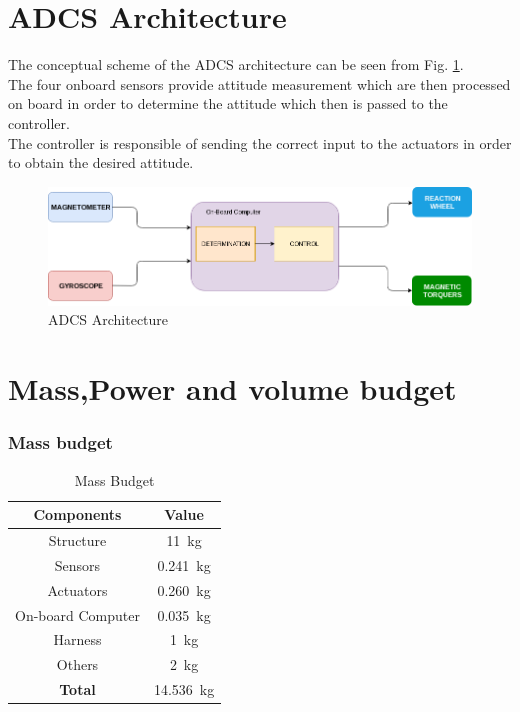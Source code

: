 \documentclass[11pt,a4paper]{report}
\begin{document}
\section{ADCS Architecture}
The conceptual scheme of the ADCS architecture can be seen from Fig. \ref{fig:architecture}.\\
The four onboard sensors provide attitude measurement which are then processed on board in order to determine the attitude which then is passed to the controller.\\
The controller is responsible of sending the correct input to the actuators in order to obtain the desired attitude.

\begin{figure}[H]
 	\centering
 	\includegraphics[scale=0.5]{gfx/adcs.png}
    \caption{ADCS Architecture}
    \label{fig:architecture}
\end{figure}

\section{Mass,Power and volume budget}

\subsubsection{Mass budget}

\begin{table}[H]
	\centering
	\begin{tabular}{|c|c|}
		\hline
		Components & Value \\
		\hline
		Structure & \SI{11}{\kilo\gram} \\
		\hline
	  	Sensors & \SI{0.241}{\kilo\gram}\\
		\hline
		Actuators & \SI{0.260}{\kilo\gram}\\
		\hline
		On-board Computer & \SI{0.035}{\kilo\gram}\\
		\hline
		Harness &  \SI{1}{\kilo\gram}\\
		\hline
        Others &  \SI{2}{\kilo\gram}\\
		\hline
		\textbf{Total} & \SI{14.536}{\kilo\gram}\\
		\hline 
	\end{tabular}
	\caption{Mass Budget}
\end{table}
\end{document}
